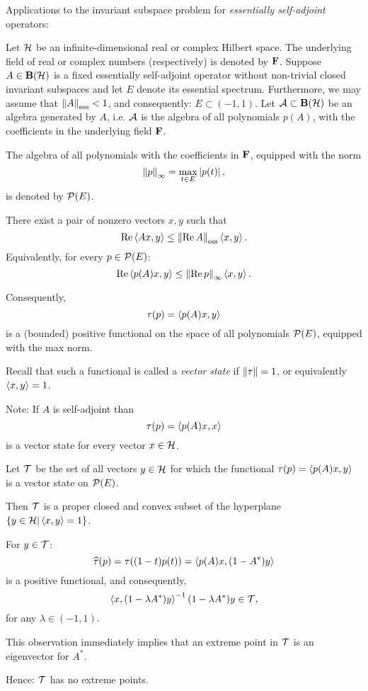 \begin{slide}{}
Applications to the invariant subspace problem for {\em
essentially self-adjoint} operators:

\smallskip

Let $\mathcal{H}$ be an infinite-dimensional real or complex Hilbert
space. The underlying field of real or complex numbers
(respectively) is denoted by $\mathbf{F}$. Suppose $A\in\mathbf{B}(\mathcal{H})$ is a
fixed essentially self-adjoint operator without non-trivial
closed invariant subspaces and let $E$ denote its essential
spectrum. Furthermore, we may assume that $\left\Vert A\right\Vert_{\operatorname{ess}}<1$, and
consequently: $E\subset(-1,1)$. Let $\mathcal{A}\subset\mathbf{B}(\mathcal{H})$ be an
algebra generated by $A$, i.e. $\mathcal{A}$ is the algebra of all
polynomials $p(A)$, with the coefficients in the underlying
field $\mathbf{F}$.

The algebra of all polynomials with the coefficients in
$\mathbf{F}$, equipped with the norm
\[ \left\Vert p\right\Vert_\infty=\max_{t\in{E}} \left\vert p(t)\right\vert, \]
is denoted by $\mathcal{P}(E)$.
\end{slide}


\begin{slide}{}
There exist a pair of nonzero vectors $x,y$ such that
\[ \operatorname{Re}\left<A{}x,y\right> \leq \left\Vert\operatorname{Re}{}A\right\Vert_{\operatorname{ess}} \left<x,y\right>. \]
Equivalently, for every $p\in\mathcal{P}(E)$:
\[ \operatorname{Re}\left<p(A)x,y\right> \leq \left\Vert\operatorname{Re}{}p\right\Vert_\infty\left<x,y\right>. \]

Consequently,
\[ \tau(p) = \left<p(A)x,y\right> \]
is a (bounded) positive functional on the space of all
polynomials $\mathcal{P}(E)$, equipped with the max norm.

Recall that such a functional is called a {\em vector state} if
$\left\Vert\tau\right\Vert=1$, or equivalently $\left<x,y\right>=1$.

Note: If $A$ is self-adjoint than
\[ \tau(p) = \left<p(A)x,x\right> \]
is a vector state for every vector $x\in\mathcal{H}$.
\end{slide}


\begin{slide}{}
Let $\mathcal{T}$ be the set of all vectors $y\in\mathcal{H}$ for which the
functional $\tau(p)=\left<p(A)x,y\right>$ is a vector state on
$\mathcal{P}(E)$.

Then $\cal{T}$ is a proper closed and convex subset of the
hyperplane $\left\{y\in\mathcal{H}|\left<x,y\right>=1\right\}$.

For $y\in\mathcal{T}$:
\[ \widehat{\tau}(p) = \tau((1-t)p(t)) =
   \left<p(A)x,(1-A^*)y\right> \]
is a positive functional, and consequently,
\[ \left<x,(1-\lambda{A^*})y\right>^{-1}(1-\lambda{A^*})y \in \mathcal{T}, \]
for any $\lambda\in(-1,1)$.

This observation immediately implies that an extreme point in
$\mathcal{T}$ is an eigenvector for $A^*$.

Hence: $\mathcal{T}$ has no extreme points.
\end{slide}


